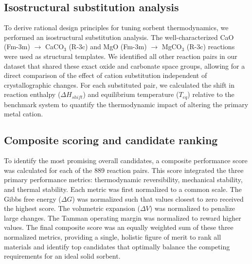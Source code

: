 \documentclass[]{article}
\begin{document}
\subsection{Isostructural substitution analysis}
To derive rational design principles for tuning sorbent thermodynamics, we performed an isostructural substitution analysis. The well-characterized CaO (Fm-3m) $\rightarrow$ CaCO$_3$ (R-3c) and MgO (Fm-3m) $\rightarrow$ MgCO$_3$ (R-3c) reactions were used as structural templates. We identified all other reaction pairs in our dataset that shared these exact oxide and carbonate space groups, allowing for a direct comparison of the effect of cation substitution independent of crystallographic changes. For each substituted pair, we calculated the shift in reaction enthalpy ($\Delta H_{shift}$) and equilibrium temperature ($T_{eq}$) relative to the benchmark system to quantify the thermodynamic impact of altering the primary metal cation.

\subsection{Composite scoring and candidate ranking}
To identify the most promising overall candidates, a composite performance score was calculated for each of the 889 reaction pairs. This score integrated the three primary performance metrics: thermodynamic reversibility, mechanical stability, and thermal stability. Each metric was first normalized to a common scale. The Gibbs free energy ($\Delta G$) was normalized such that values closest to zero received the highest score. The volumetric expansion ($\Delta V$) was normalized to penalize large changes. The Tamman operating margin was normalized to reward higher values. The final composite score was an equally weighted sum of these three normalized metrics, providing a single, holistic figure of merit to rank all materials and identify top candidates that optimally balance the competing requirements for an ideal solid sorbent.
\end{document}
